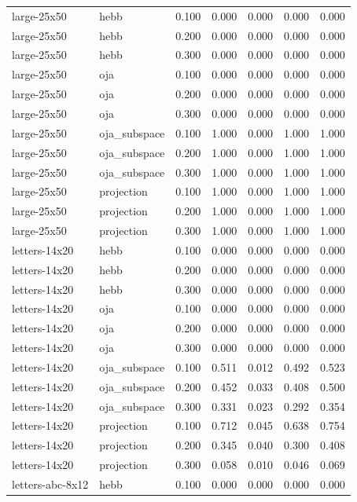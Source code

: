 \begin{tabular}{llrrrrr}
large-25x50 & hebb & 0.100 & 0.000 & 0.000 & 0.000 & 0.000 \\
large-25x50 & hebb & 0.200 & 0.000 & 0.000 & 0.000 & 0.000 \\
large-25x50 & hebb & 0.300 & 0.000 & 0.000 & 0.000 & 0.000 \\
large-25x50 & oja & 0.100 & 0.000 & 0.000 & 0.000 & 0.000 \\
large-25x50 & oja & 0.200 & 0.000 & 0.000 & 0.000 & 0.000 \\
large-25x50 & oja & 0.300 & 0.000 & 0.000 & 0.000 & 0.000 \\
large-25x50 & oja\_subspace & 0.100 & 1.000 & 0.000 & 1.000 & 1.000 \\
large-25x50 & oja\_subspace & 0.200 & 1.000 & 0.000 & 1.000 & 1.000 \\
large-25x50 & oja\_subspace & 0.300 & 1.000 & 0.000 & 1.000 & 1.000 \\
large-25x50 & projection & 0.100 & 1.000 & 0.000 & 1.000 & 1.000 \\
large-25x50 & projection & 0.200 & 1.000 & 0.000 & 1.000 & 1.000 \\
large-25x50 & projection & 0.300 & 1.000 & 0.000 & 1.000 & 1.000 \\
letters-14x20 & hebb & 0.100 & 0.000 & 0.000 & 0.000 & 0.000 \\
letters-14x20 & hebb & 0.200 & 0.000 & 0.000 & 0.000 & 0.000 \\
letters-14x20 & hebb & 0.300 & 0.000 & 0.000 & 0.000 & 0.000 \\
letters-14x20 & oja & 0.100 & 0.000 & 0.000 & 0.000 & 0.000 \\
letters-14x20 & oja & 0.200 & 0.000 & 0.000 & 0.000 & 0.000 \\
letters-14x20 & oja & 0.300 & 0.000 & 0.000 & 0.000 & 0.000 \\
letters-14x20 & oja\_subspace & 0.100 & 0.511 & 0.012 & 0.492 & 0.523 \\
letters-14x20 & oja\_subspace & 0.200 & 0.452 & 0.033 & 0.408 & 0.500 \\
letters-14x20 & oja\_subspace & 0.300 & 0.331 & 0.023 & 0.292 & 0.354 \\
letters-14x20 & projection & 0.100 & 0.712 & 0.045 & 0.638 & 0.754 \\
letters-14x20 & projection & 0.200 & 0.345 & 0.040 & 0.300 & 0.408 \\
letters-14x20 & projection & 0.300 & 0.058 & 0.010 & 0.046 & 0.069 \\
letters-abc-8x12 & hebb & 0.100 & 0.000 & 0.000 & 0.000 & 0.000 \\

\end{tabular}
